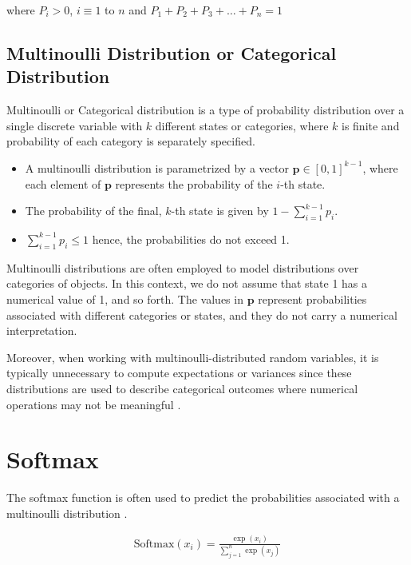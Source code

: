 where \(P_i > 0\), \(i \equiv 1\) to \(n\) and \(P_1 + P_2 + P_3 + \ldots + P_n = 1\) \\

\subsection*{Multinoulli Distribution or Categorical Distribution}

Multinoulli or Categorical distribution is a type of probability distribution over a single discrete variable with $ k $ different states or categories, where $ k $ is finite and probability of each category is separately specified.

\begin{itemize}
    \item A multinoulli distribution is parametrized by a vector $\mathbf{p} \in [0, 1]^{k-1}$, where each element of $\mathbf{p}$ represents the probability of the $i$-th state. 
    \item  The probability of the final, $k$-th state is given by $1 - \sum_{i=1}^{k-1} p_i$. 
    \item  $\sum_{i=1}^{k-1} p_i \leq 1$ hence, the probabilities do not exceed 1. 
\end{itemize}



Multinoulli distributions are often employed to model distributions over categories of objects. In this context, we do not assume that state 1 has a numerical value of 1, and so forth. The values in $\mathbf{p}$ represent probabilities associated with different categories or states, and they do not carry a numerical interpretation.

Moreover, when working with multinoulli-distributed random variables, it is typically unnecessary to compute expectations or variances since these distributions are used to describe categorical outcomes where numerical operations may not be meaningful \parencite[Page 60,61]{Goodfellow-et-al-2016}. 


\section{Softmax}

The softmax function is often used to predict the probabilities associated with a multinoulli distribution \parencite[Page 79]{Goodfellow-et-al-2016}.

\begin{align}
    \text{Softmax}(x_i) = \frac{{\exp(x_i)}}{{\sum_{j=1}^n \exp(x_j)}} \label{eq:softmax_matth}
\end{align}

